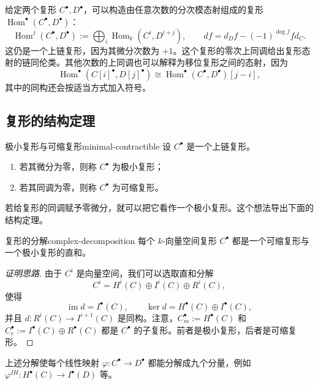 给定两个复形 $C^\bullet,D^\bullet$，可以构造由任意次数的分次模态射组成的复形 $\operatorname{Hom}^\bullet(C^\bullet,D^\bullet)$：
\[
  \operatorname{Hom}^j(C^\bullet,D^\bullet)
  :=\bigoplus_i\operatorname{Hom}_k(C^i,D^{i+j}),\qquad
  df=d_Df-(-1)^{\deg f}fd_C.
\]
这仍是一个上链复形，因为其微分次数为 $+1$。这个复形的零次上同调给出复形态射的链同伦类。其他次数的上同调也可以解释为移位复形之间的态射，因为
\[
  \operatorname{Hom}^\bullet(C[i]^\bullet,D[j]^\bullet)
  \cong\operatorname{Hom}^\bullet(C^\bullet,D^\bullet)[j-i],
\]
其中的同构还会按适当方式加入符号。

\subsection{复形的结构定理}\label{subsec:complex-structure}
\begin{definition}{极小复形与可缩复形}{minimal-contractible}
设 $C^\bullet$ 是一个上链复形。
\begin{enumerate}
  \item 若其微分为零，则称 $C^\bullet$ 为极小复形；
  \item 若其同调为零，则称 $C^\bullet$ 为可缩复形。
\end{enumerate}
\end{definition}
若给复形的同调赋予零微分，就可以把它看作一个极小复形。这个想法导出下面的结构定理。

\begin{theorem}{复形的分解}{complex-decomposition}
每个 $k$-向量空间复形 $C^\bullet$ 都是一个可缩复形与一个极小复形的直和。
\end{theorem}
\begin{proof}[证明思路]
由于 $C^i$ 是向量空间，我们可以选取直和分解
\[
  C^i=H^i(C)\oplus I^i(C)\oplus R^i(C),
\]
使得
\[
  \operatorname{im}d=I^\bullet(C),\qquad
  \ker d=H^\bullet(C)\oplus I^\bullet(C),
\]
并且 $d\colon R^i(C)\to I^{i+1}(C)$ 是同构。注意，$C_m^\bullet:=H^\bullet(C)$ 和 $C_c^\bullet:=I^\bullet(C)\oplus R^\bullet(C)$ 都是 $C^\bullet$ 的子复形。前者是极小复形，后者是可缩复形。
\end{proof}
上述分解使每个线性映射 $\varphi\colon C^\bullet\to D^\bullet$ 都能分解成九个分量，例如 $\varphi^{IH}\colon H^\bullet(C)\to I^\bullet(D)$ 等。

